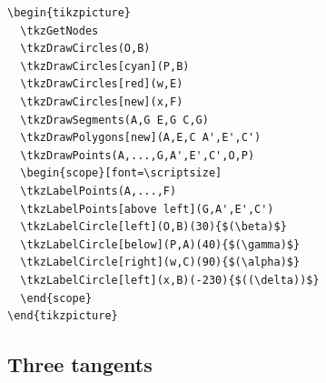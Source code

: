 \begin{Verbatim}
\begin{tikzpicture}
  \tkzGetNodes
  \tkzDrawCircles(O,B)
  \tkzDrawCircles[cyan](P,B)
  \tkzDrawCircles[red](w,E)
  \tkzDrawCircles[new](x,F)
  \tkzDrawSegments(A,G E,G C,G)
  \tkzDrawPolygons[new](A,E,C A',E',C')
  \tkzDrawPoints(A,...,G,A',E',C',O,P)
  \begin{scope}[font=\scriptsize]
  \tkzLabelPoints(A,...,F)
  \tkzLabelPoints[above left](G,A',E',C')
  \tkzLabelCircle[left](O,B)(30){$(\beta)$}
  \tkzLabelCircle[below](P,A)(40){$(\gamma)$}
  \tkzLabelCircle[right](w,C)(90){$(\alpha)$}
  \tkzLabelCircle[left](x,B)(-230){$((\delta))$}
  \end{scope}
\end{tikzpicture}
\end{Verbatim}


\subsection{Three tangents} %
\label{sub:three_tangents}

